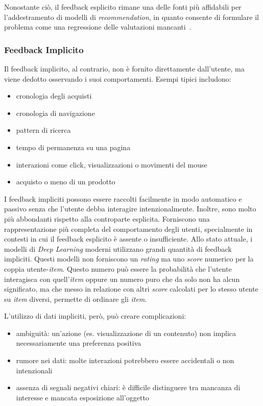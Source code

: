 Nonostante ciò, il feedback esplicito rimane una delle fonti più affidabili per l'addestramento di modelli di \textit{recommendation}, in quanto consente di formulare il problema come una regressione delle valutazioni mancanti~\cite{Implicit_feedback}.

\subsubsection{Feedback Implicito}

Il feedback implicito, al contrario, non è fornito direttamente dall'utente, ma viene dedotto osservando i suoi comportamenti. Esempi tipici includono:

\begin{itemize}
    \item cronologia degli acquisti
    \item cronologia di navigazione
    \item pattern di ricerca
    \item tempo di permanenza su una pagina
    \item interazioni come click, visualizzazioni o movimenti del mouse
    \item acquisto o meno di un prodotto
\end{itemize}

I feedback impliciti possono essere raccolti facilmente in modo automatico e passivo senza che l'utente debba interagire intenzionalmente. Inoltre, sono molto più abbondanti rispetto alla controparte esplicita. Forniscono una rappresentazione più completa del comportamento degli utenti, specialmente in contesti in cui il feedback esplicito è assente o insufficiente. Allo stato attuale, i modelli di \textit{Deep Learning} moderni utilizzano grandi quantità di feedback impliciti. Questi modelli non forniscono un \textit{rating} ma uno \textit{score} numerico per la coppia utente-\textit{item}. Questo numero può essere la probabilità che l'utente interagisca con quell'\textit{item} oppure un numero puro che da solo non ha alcun significato, ma che messo in relazione con altri \textit{score} calcolati per lo stesso utente su \textit{item} diversi, permette di ordinare gli \textit{item}.

L'utilizzo di dati impliciti, però, può creare complicazioni:

\begin{itemize}
    \item ambiguità: un'azione (es. visualizzazione di un contenuto) non implica necessariamente una preferenza positiva
    \item rumore nei dati: molte interazioni potrebbero essere accidentali o non intenzionali
    \item assenza di segnali negativi chiari: è difficile distinguere tra mancanza di interesse e mancata esposizione all'oggetto
\end{itemize}

